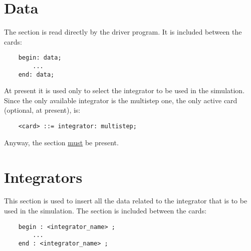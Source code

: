 %
%
%
%
%
% 
%
%

\chapter{Data}
The  section is read directly by the driver program. It is
included between the cards:
\begin{verbatim}
    begin: data;
        ...
    end: data;
\end{verbatim}
At present it is used only to select the integrator to be used in the
simulation. 
Since the only available integrator is the multistep one, the only active 
card (optional, at present), is:
\begin{verbatim}
    <card> ::= integrator: multistep;
\end{verbatim}
Anyway, the  section \underline{must} be present.





\chapter{Integrators}
This section is used to insert all the data related to the integrator that
is to be used in the simulation. The section is included between the cards:
\begin{verbatim}
    begin : <integrator_name> ;
        ...
    end : <integrator_name> ;
\end{verbatim}





